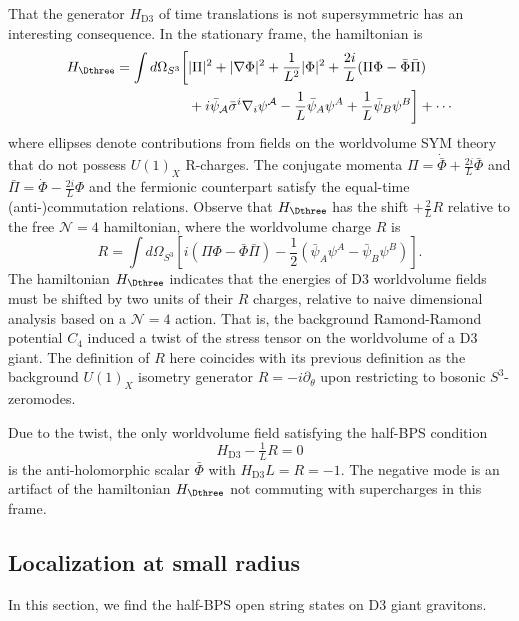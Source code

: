 \documentclass[a4paper,12pt]{article}
\begin{document}
That the generator $H_{\mathrm{D3}}$ of time translations is not supersymmetric has an interesting consequence. In the stationary frame, the hamiltonian is
\begin{align}
    H_{\Dthree} = \int d\Omega_{S^3} \bigg[ &|\Pi|^2 + |\nabla\Phi|^2 + \frac{1}{L^2}|\Phi|^2 + \frac{2 i}{L} ( \Pi \Phi - \bar\Phi \bar\Pi ) \nonumber \\
    &+i \bar\psi_{\mathcal{A}} \bar\sigma^i \nabla_i \psi^{\mathcal{A}} - \frac{1}{L} \bar\psi_A \psi^A + \frac{1}{L} \bar\psi_B \psi^B  \bigg] + \cdots
\end{align}
where ellipses denote contributions from fields on the worldvolume SYM theory that do not possess $U(1)_X$ R-charges. The conjugate momenta $\Pi = \dot{\bar{\Phi}} + \frac{2 i}{L} \bar\Phi$ and $\bar\Pi = \dot{\Phi} - \frac{2 i}{L} \Phi$ and the fermionic counterpart satisfy the equal-time (anti-)commutation relations. Observe that $H_\Dthree$ has the shift $+\frac{2}{L}R$ relative to the free $\mathcal{N}=4$ hamiltonian, where the worldvolume charge $R$ is
\begin{equation}
R = \int d\Omega_{S^3} \left[ i ( \Pi \Phi - \bar\Phi \bar\Pi ) - \frac{1}{2} (\bar\psi_A \psi^A - \bar\psi_B \psi^B)  \right ].
\end{equation}
The hamiltonian $H_\Dthree$ indicates that the energies of D3 worldvolume fields must be shifted by two units of their $R$ charges, relative to naive dimensional analysis based on a $\mathcal{N}=4$ action. That is, the background Ramond-Ramond potential $C_4$ induced a twist of the stress tensor on the worldvolume of a D3 giant. The definition of $R$ here coincides with its previous definition as the background $U(1)_X$ isometry generator $R = -i \partial_\theta$ upon restricting to bosonic $S^3$-zeromodes.

Due to the twist, the only worldvolume field satisfying the half-BPS condition
\begin{equation}
H_{\mathrm{D3}} - \tfrac{1}{L}R = 0
\end{equation}
is the anti-holomorphic scalar $\bar{\Phi}$ with $H_{\mathrm{D3}} L = R = -1$. The negative mode is an artifact of the hamiltonian $H_\Dthree$ not commuting with supercharges in this frame.


\subsection{Localization at small radius} \label{subsec:localization}

In this section, we find the half-BPS open string states on D3 giant gravitons. 
\end{document}
